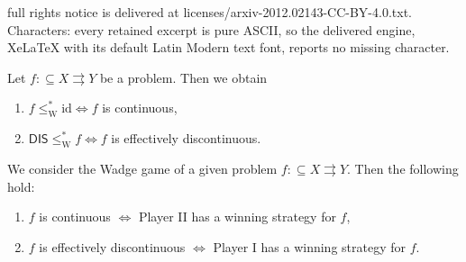 \documentclass[10pt,a4paper]{amsart}
\def\DIS{\mathsf{DIS}}
\def\In{\subseteq}
\def\id{{\mathrm{id}}}
\def\mto{\rightrightarrows}
\begin{document}
full rights notice is delivered at licenses/arxiv-2012.02143-CC-BY-4.0.txt. Characters: every retained excerpt is pure ASCII, so the delivered engine, XeLaTeX with its default Latin Modern text font, reports no missing character.
\begin{theorem}
\label{thm:dichotomy}
Let $f:\In X\mto Y$ be a problem. Then we obtain
\begin{enumerate}
\item $f\leq_\mathrm{W}^*\id\iff f$ is continuous,
\item $\DIS\leq_\mathrm{W}^*f\iff f$ is effectively discontinuous.
\end{enumerate}
\end{theorem}

\begin{theorem}
\label{thm:Wadge-game}
We consider the Wadge game of a given problem ${f:\In X\mto Y}$.
Then the following hold:
\begin{enumerate}
\item $f$ is continuous $\iff$ Player II has a winning strategy for $f$,
\item $f$ is effectively discontinuous $\iff$ Player I has a winning strategy for $f$.
\end{enumerate}
\end{theorem}
\end{document}
